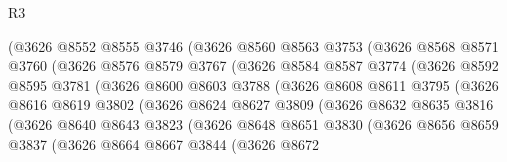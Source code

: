 \begin{lexlean}{R3}
\begin{coremodule}
                    (@3626
                      @8552
                      @8555
                      @3746
                      (@3626
                        @8560
                        @8563
                        @3753
                        (@3626
                          @8568
                          @8571
                          @3760
                          (@3626
                            @8576
                            @8579
                            @3767
                            (@3626
                              @8584
                              @8587
                              @3774
                              (@3626
                                @8592
                                @8595
                                @3781
                                (@3626
                                  @8600
                                  @8603
                                  @3788
                                  (@3626
                                    @8608
                                    @8611
                                    @3795
                                    (@3626
                                      @8616
                                      @8619
                                      @3802
                                      (@3626
                                        @8624
                                        @8627
                                        @3809
                                        (@3626
                                          @8632
                                          @8635
                                          @3816
                                          (@3626
                                            @8640
                                            @8643
                                            @3823
                                            (@3626
                                              @8648
                                              @8651
                                              @3830
                                              (@3626
                                                @8656
                                                @8659
                                                @3837
                                                (@3626
                                                  @8664
                                                  @8667
                                                  @3844
                                                  (@3626
                                                    @8672

\end{coremodule}
\end{lexlean}
